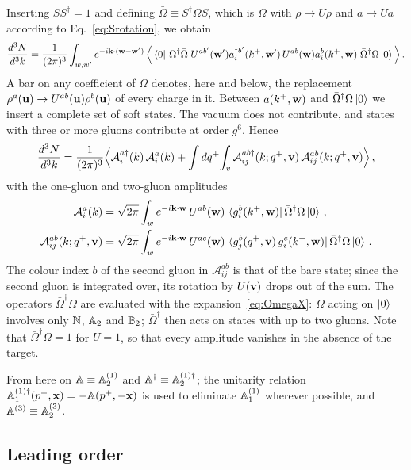 Inserting $SS^\dagger=1$ and defining $\bar\Omega\equiv S^\dagger\Omega S$, which is $\Omega$ with $\rho\to U\rho$ and $a\to Ua$ according to Eq.~\eqref{eq:Srotation}, we obtain
\begin{align}
\frac{d^3N}{d^3k}=\frac{1}{(2\pi)^3}\int_{w,w'}e^{-i\mathbf{k}\cdot(\mathbf{w}-\mathbf{w}')}\,\Big\langle\bra0\,\Omega^\dagger\bar\Omega\;U^{ab'}(\mathbf{w}')a^{\dagger b'}_i(k^+,\mathbf{w}')\,U^{ab}(\mathbf{w})a^b_i(k^+,\mathbf{w})\;\bar\Omega^\dagger\Omega\ket0\Big\rangle\,.
\end{align}
A bar on any coefficient of $\Omega$ denotes, here and below, the replacement $\rho^a(\mathbf{u})\to U^{ab}(\mathbf{u})\rho^b(\mathbf{u})$ of every charge in it. Between $a(k^+,\mathbf{w})$ and $\bar\Omega^\dagger\Omega\ket0$ we insert a complete set of soft states. The vacuum does not contribute, and states with three or more gluons contribute at order $g^6$. Hence
\begin{align}\label{eq:N_amplitudes}
\frac{d^3N}{d^3k}=\frac{1}{(2\pi)^3}\Big\langle\mathcal A^{a\dagger}_i(k)\,\mathcal A^a_i(k)+\int dq^+\!\int_{v}\mathcal A^{ab\dagger}_{ij}(k;q^+,\mathbf{v})\,\mathcal A^{ab}_{ij}(k;q^+,\mathbf{v})\Big\rangle\,,
\end{align}
with the one-gluon and two-gluon amplitudes
\begin{align}\label{eq:amplitudes_def}
\mathcal A^a_i(k)&=\sqrt{2\pi}\int_{w}e^{-i\mathbf{k}\cdot\mathbf{w}}\,U^{ab}(\mathbf{w})\,\bra{g^b_i(k^+,\mathbf{w})}\bar\Omega^\dagger\Omega\ket0\,,\notag\\
\mathcal A^{ab}_{ij}(k;q^+,\mathbf{v})&=\sqrt{2\pi}\int_{w}e^{-i\mathbf{k}\cdot\mathbf{w}}\,U^{ac}(\mathbf{w})\,\bra{g^b_j(q^+,\mathbf{v})\,g^c_i(k^+,\mathbf{w})}\bar\Omega^\dagger\Omega\ket0\,.
\end{align}
The colour index $b$ of the second gluon in $\mathcal A^{ab}_{ij}$ is that of the bare state; since the second gluon is integrated over, its rotation by $U(\mathbf{v})$ drops out of the sum. The operators $\bar\Omega^\dagger\Omega$ are evaluated with the expansion~\eqref{eq:OmegaX}: $\Omega$ acting on $\ket0$ involves only $\mathbb{N}$, $\mathbb{A}_2$ and $\mathbb{B}_2$; $\bar\Omega^\dagger$ then acts on states with up to two gluons. Note that $\bar\Omega^\dagger\Omega=1$ for $U=1$, so that every amplitude vanishes in the absence of the target.

From here on $\mathbb{A}\equiv\mathbb{A}^{(1)}_2$ and $\mathbb{A}^\dagger\equiv\mathbb{A}^{(1)\dagger}_2$; the unitarity relation $\mathbb{A}^{(1)\dagger}_1(p^+,\mathbf{x})=-\mathbb{A}(p^+,-\mathbf{x})$ is used to eliminate $\mathbb{A}^{(1)}_1$ wherever possible, and $\mathbb{A}^{(3)}\equiv\mathbb{A}^{(3)}_2$.

\subsection{Leading order}\label{sec:LO}

